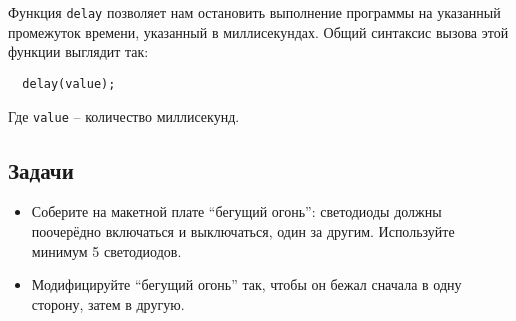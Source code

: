 \documentclass[../sparc.tex]{subfiles}
\begin{document}
Функция \texttt{delay} позволяет нам остановить выполнение программы на
указанный промежуток времени, указанный в миллисекундах.  Общий синтаксис вызова
этой функции выглядит так:

\begin{verbatim}
  delay(value);
\end{verbatim}

Где \texttt{value} -- количество миллисекунд.

\subsection{Задачи}
\begin{itemize}
\item Соберите на макетной плате ``бегущий огонь'': светодиоды должны поочерёдно
  включаться и выключаться, один за другим.  Используйте минимум 5 светодиодов.
\item Модифицируйте ``бегущий огонь'' так, чтобы он бежал сначала в одну
  сторону, затем в другую.
\end{itemize}
\end{document}
